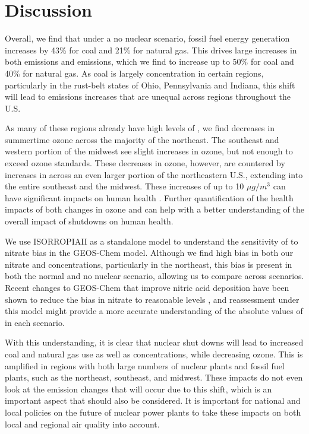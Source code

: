 \documentclass[12]{article}
\begin{document}
\section{Discussion}

Overall, we find that under a no nuclear scenario, fossil fuel energy generation increases by 43\% for coal and 21\% for natural gas. This drives large increases in both  emissions and  emissions, which we find to increase up to 50\% for coal and 40\% for natural gas. As coal is largely concentration in certain regions, particularly in the rust-belt states of Ohio, Pennsylvania and Indiana, this shift will lead to emissions increases that are unequal across regions throughout the U.S.

As many of these regions already have high levels of , we find decreases in summertime ozone across the majority of the northeast. The southeast and western portion of the midwest see slight increases in ozone, but not enough to exceed ozone standards. These decreases in ozone, however, are countered by increases in  across an even larger portion of the northeastern U.S., extending into the entire southeast and the midwest. These increases of up to 10 $\mu g/m^3$ can have significant impacts on human health \citep{burnett_global_2018}. Further quantification of the health impacts of both changes in ozone and  can help with a better understanding of the overall impact of shutdowns on human health. 

We use ISORROPIAII as a standalone model to understand the sensitivity of  to nitrate bias in the GEOS-Chem model. Although we find high bias in both our nitrate and  concentrations, particularly in the northeast, this bias is present in both the normal and no nuclear scenario, allowing us to compare across scenarios. Recent changes to GEOS-Chem that improve nitric acid deposition have been shown to reduce the bias in nitrate to reasonable levels \citep{luo_revised_2019}, and reassessment under this model might provide a more accurate understanding of the absolute values of  in each scenario.

With this understanding, it is clear that nuclear shut downs will lead to increased coal and natural gas use as well as  concentrations, while decreasing ozone. This is amplified in regions with both large numbers of nuclear plants and fossil fuel plants, such as the northeast, southeast, and midwest. These impacts do not even look at the  emission changes that will occur due to this shift, which is an important aspect that should also be considered. It is important for national and local policies on the future of nuclear power plants to take these impacts on both local and regional air quality into account.


\pagebreak


\end{document}

